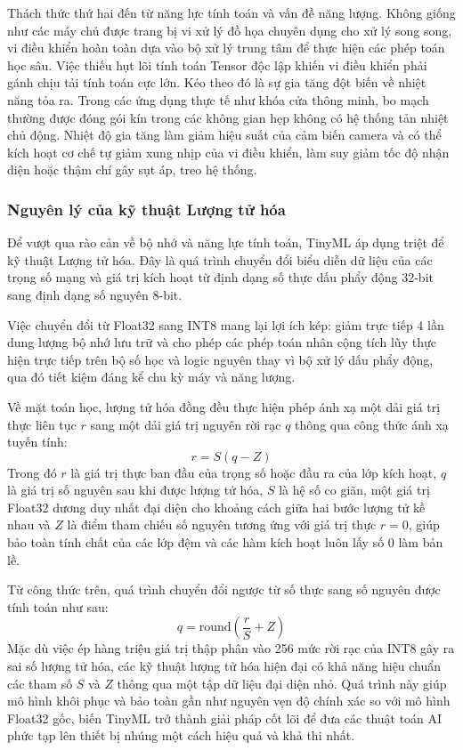 Thách thức thứ hai đến từ năng lực tính toán và vấn đề năng lượng. Không giống như các máy chủ được trang bị vi xử lý đồ họa chuyên dụng cho xử lý song song, vi điều khiển hoàn toàn dựa vào bộ xử lý trung tâm để thực hiện các phép toán học sâu. Việc thiếu hụt lõi tính toán Tensor độc lập khiến vi điều khiển phải gánh chịu tải tính toán cực lớn. Kéo theo đó là sự gia tăng đột biến về nhiệt năng tỏa ra. Trong các ứng dụng thực tế như khóa cửa thông minh, bo mạch thường được đóng gói kín trong các không gian hẹp không có hệ thống tản nhiệt chủ động. Nhiệt độ gia tăng làm giảm hiệu suất của cảm biến camera và có thể kích hoạt cơ chế tự giảm xung nhịp của vi điều khiển, làm suy giảm tốc độ nhận diện hoặc thậm chí gây sụt áp, treo hệ thống.

\subsubsection{Nguyên lý của kỹ thuật Lượng tử hóa}
Để vượt qua rào cản về bộ nhớ và năng lực tính toán, TinyML áp dụng triệt để kỹ thuật Lượng tử hóa. Đây là quá trình chuyển đổi biểu diễn dữ liệu của các trọng số mạng và giá trị kích hoạt từ định dạng số thực dấu phẩy động 32-bit sang định dạng số nguyên 8-bit.

Việc chuyển đổi từ Float32 sang INT8 mang lại lợi ích kép: giảm trực tiếp 4 lần dung lượng bộ nhớ lưu trữ và cho phép các phép toán nhân cộng tích lũy thực hiện trực tiếp trên bộ số học và logic nguyên thay vì bộ xử lý dấu phẩy động, qua đó tiết kiệm đáng kể chu kỳ máy và năng lượng.

Về mặt toán học, lượng tử hóa đồng đều thực hiện phép ánh xạ một dải giá trị thực liên tục $r$ sang một dải giá trị nguyên rời rạc $q$ thông qua công thức ánh xạ tuyến tính:
$$
r = S(q - Z)
$$
Trong đó $r$ là giá trị thực ban đầu của trọng số hoặc đầu ra của lớp kích hoạt, $q$ là giá trị số nguyên sau khi được lượng tử hóa, $S$ là hệ số co giãn, một giá trị Float32 dương duy nhất đại diện cho khoảng cách giữa hai bước lượng tử kề nhau và $Z$ là điểm tham chiếu số nguyên tương ứng với giá trị thực $r = 0$, giúp bảo toàn tính chất của các lớp đệm và các hàm kích hoạt luôn lấy số 0 làm bản lề.

Từ công thức trên, quá trình chuyển đổi ngược từ số thực sang số nguyên được tính toán như sau:
$$
q = \text{round}\left(\frac{r}{S} + Z\right)
$$
Mặc dù việc ép hàng triệu giá trị thập phân vào 256 mức rời rạc của INT8 gây ra sai số lượng tử hóa, các kỹ thuật lượng tử hóa hiện đại có khả năng hiệu chuẩn các tham số $S$ và $Z$ thông qua một tập dữ liệu đại diện nhỏ. Quá trình này giúp mô hình khôi phục và bảo toàn gần như nguyên vẹn độ chính xác so với mô hình Float32 gốc, biến TinyML trở thành giải pháp cốt lõi để đưa các thuật toán AI phức tạp lên thiết bị nhúng một cách hiệu quả và khả thi nhất.

